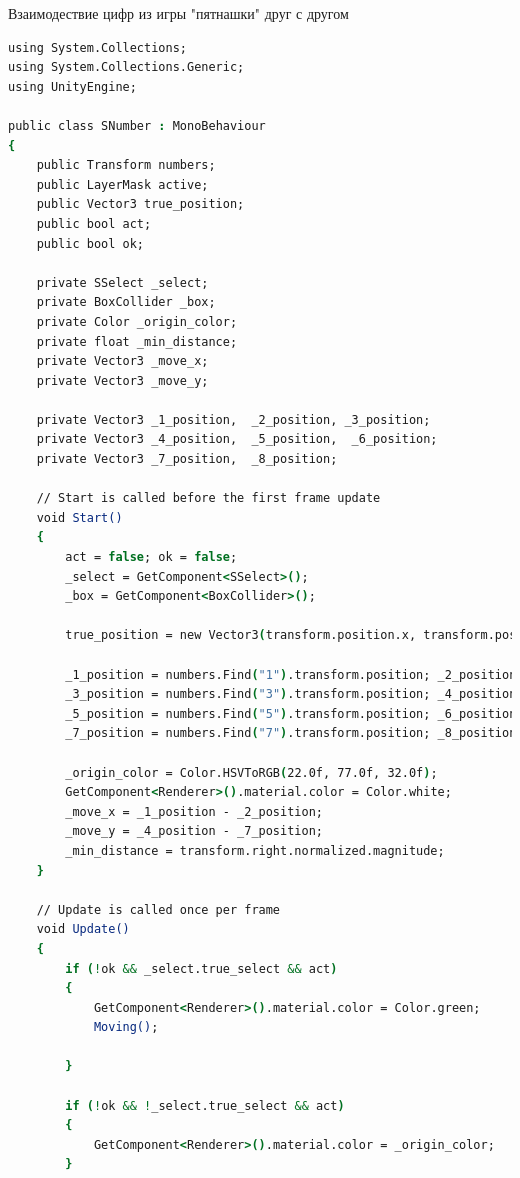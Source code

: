  Взаимодествие цифр из игры "пятнашки" друг с другом

\begin{lstlisting}[language=csh]
using System.Collections;
using System.Collections.Generic;
using UnityEngine;

public class SNumber : MonoBehaviour
{
    public Transform numbers;
    public LayerMask active;
    public Vector3 true_position;
    public bool act;
    public bool ok;

    private SSelect _select;
    private BoxCollider _box;
    private Color _origin_color;
    private float _min_distance;
    private Vector3 _move_x;
    private Vector3 _move_y;

    private Vector3 _1_position,  _2_position, _3_position;
    private Vector3 _4_position,  _5_position,  _6_position;
    private Vector3 _7_position,  _8_position;

    // Start is called before the first frame update
    void Start()
    {
        act = false; ok = false;
        _select = GetComponent<SSelect>();
        _box = GetComponent<BoxCollider>();

        true_position = new Vector3(transform.position.x, transform.position.y, transform.position.z);

        _1_position = numbers.Find("1").transform.position; _2_position = numbers.Find("2").transform.position;
        _3_position = numbers.Find("3").transform.position; _4_position = numbers.Find("4").transform.position;
        _5_position = numbers.Find("5").transform.position; _6_position = numbers.Find("6").transform.position;
        _7_position = numbers.Find("7").transform.position; _8_position = numbers.Find("8").transform.position;

        _origin_color = Color.HSVToRGB(22.0f, 77.0f, 32.0f);
        GetComponent<Renderer>().material.color = Color.white;
        _move_x = _1_position - _2_position;
        _move_y = _4_position - _7_position;
        _min_distance = transform.right.normalized.magnitude;
    }

    // Update is called once per frame
    void Update()
    {
        if (!ok && _select.true_select && act)
        {
            GetComponent<Renderer>().material.color = Color.green;
            Moving();

        }

        if (!ok && !_select.true_select && act)
        {
            GetComponent<Renderer>().material.color = _origin_color;
        }


\end{lstlisting}
